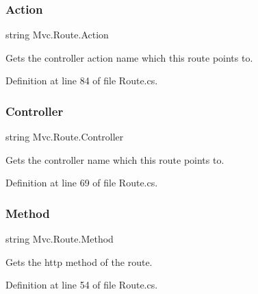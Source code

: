 \subsubsection{\texorpdfstring{Action}{Action}}
{\footnotesize\ttfamily string Mvc.\+Route.\+Action\hspace{0.3cm}{\ttfamily [get]}}



Gets the controller action name which this route points to. 



Definition at line 84 of file Route.\+cs.

\mbox{\label{class_mvc_1_1_route_a2dcaf1f94a1c5698dcfaf9a31f4c4a91}} 
\subsubsection{\texorpdfstring{Controller}{Controller}}
{\footnotesize\ttfamily string Mvc.\+Route.\+Controller\hspace{0.3cm}{\ttfamily [get]}}



Gets the controller name which this route points to. 



Definition at line 69 of file Route.\+cs.

\mbox{\label{class_mvc_1_1_route_a29c932cbf29b1b8f2abcd8a4ca3c3c39}} 
\subsubsection{\texorpdfstring{Method}{Method}}
{\footnotesize\ttfamily string Mvc.\+Route.\+Method\hspace{0.3cm}{\ttfamily [get]}}



Gets the http method of the route. 



Definition at line 54 of file Route.\+cs.

\mbox{\label{class_mvc_1_1_route_a7dc92739ebd8410bc2cffc26e14a76bf}} 
